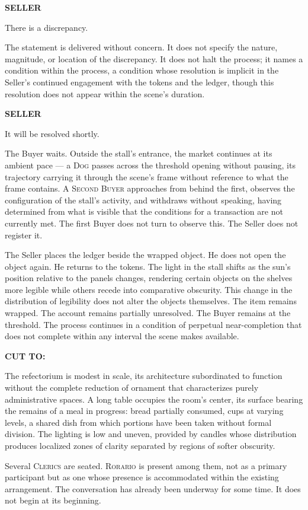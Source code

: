 \documentclass[12pt, oneside]{article}
\newcommand{\sceneheading}[1]{%
  \vspace{1.8em}%
  \noindent{\bfseries\large\MakeUppercase{#1}}%
  \vspace{0.6em}%
  \par\noindent{\color{rulecolor}\rule{\linewidth}{0.3pt}}%
  \vspace{0.5em}\par%
}
\newenvironment{action}{%
  \vspace{0.6em}%
  \noindent\ignorespaces%
}{%
  \par\vspace{0.6em}%
}
\newcommand{\character}[1]{%
  \vspace{0.8em}%
  \begin{center}%
    \bfseries\MakeUppercase{#1}%
  \end{center}%
  \vspace{-0.3em}%
}
\newenvironment{dialogue}{%
  \vspace{0.2em}%
  \begin{list}{}{%
    \setlength{\leftmargin}{1.2in}%
    \setlength{\rightmargin}{0.8in}%
    \setlength{\itemsep}{0.6em}%
    \setlength{\parsep}{0pt}%
  }%
}{%
  \end{list}%
  \vspace{0.4em}%
}
\newcommand{\says}[2]{%
  \character{#1}%
  \begin{dialogue}\item #2\end{dialogue}%
}
\newcommand{\transition}[1]{%
  \vspace{0.8em}%
  \begin{flushright}%
    \bfseries #1%
  \end{flushright}%
  \vspace{0.5em}%
}
\begin{document}
\says{Seller}{There is a discrepancy.}

\begin{action}
The statement is delivered without concern. It does not specify the nature, magnitude, or location of the discrepancy. It does not halt the process; it names a condition within the process, a condition whose resolution is implicit in the Seller's continued engagement with the tokens and the ledger, though this resolution does not appear within the scene's duration.
\end{action}

\says{Seller}{It will be resolved shortly.}

\begin{action}
The Buyer waits. Outside the stall's entrance, the market continues at its ambient pace --- a \textsc{Dog} passes across the threshold opening without pausing, its trajectory carrying it through the scene's frame without reference to what the frame contains. A \textsc{Second Buyer} approaches from behind the first, observes the configuration of the stall's activity, and withdraws without speaking, having determined from what is visible that the conditions for a transaction are not currently met. The first Buyer does not turn to observe this. The Seller does not register it.

The Seller places the ledger beside the wrapped object. He does not open the object again. He returns to the tokens. The light in the stall shifts as the sun's position relative to the panels changes, rendering certain objects on the shelves more legible while others recede into comparative obscurity. This change in the distribution of legibility does not alter the objects themselves. The item remains wrapped. The account remains partially unresolved. The Buyer remains at the threshold. The process continues in a condition of perpetual near-completion that does not complete within any interval the scene makes available.
\end{action}

\transition{CUT TO:}

\sceneheading{INT. Clerical Refectorium — Evening}

\begin{action}
The refectorium is modest in scale, its architecture subordinated to function without the complete reduction of ornament that characterizes purely administrative spaces. A long table occupies the room's center, its surface bearing the remains of a meal in progress: bread partially consumed, cups at varying levels, a shared dish from which portions have been taken without formal division. The lighting is low and uneven, provided by candles whose distribution produces localized zones of clarity separated by regions of softer obscurity.

Several \textsc{Clerics} are seated. \textsc{Rorario} is present among them, not as a primary participant but as one whose presence is accommodated within the existing arrangement. The conversation has already been underway for some time. It does not begin at its beginning.
\end{action}
\end{document}
